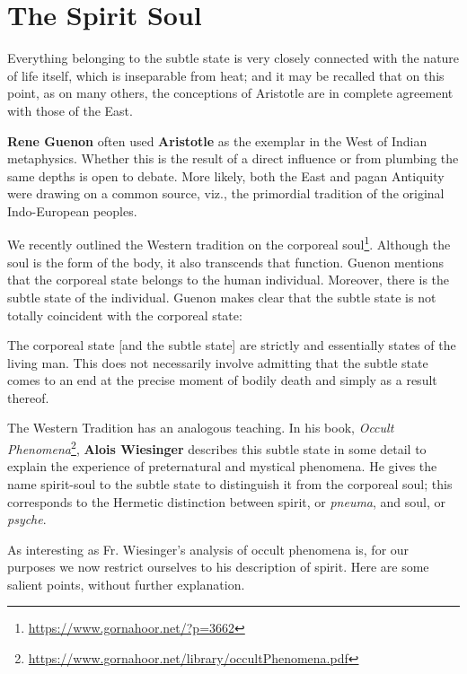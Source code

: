 \section{The Spirit Soul}

\begin{quotex}
Everything belonging to the subtle state is very closely connected with the nature of life itself, which is inseparable from heat; and it may be recalled that on this point, as on many others, the conceptions of Aristotle are in complete agreement with those of the East. 

\end{quotex}
\textbf{Rene Guenon} often used \textbf{Aristotle} as the exemplar in the West of Indian metaphysics. Whether this is the result of a direct influence or from plumbing the same depths is open to debate. More likely, both the East and pagan Antiquity were drawing on a common source, viz., the primordial tradition of the original Indo-European peoples.

We recently outlined the Western tradition on the corporeal soul\footnote{\url{https://www.gornahoor.net/?p=3662}}. Although the soul is the form of the body, it also transcends that function. Guenon mentions that the corporeal state belongs to the human individual. Moreover, there is the subtle state of the individual. Guenon makes clear that the subtle state is not totally coincident with the corporeal state:

\begin{quotex}
The corporeal state [and the subtle state] are strictly and essentially states of the living man. This does not necessarily involve admitting that the subtle state comes to an end at the precise moment of bodily death and simply as a result thereof. 

\end{quotex}
The Western Tradition has an analogous teaching. In his book, \textit{Occult Phenomena}\footnote{\url{https://www.gornahoor.net/library/occultPhenomena.pdf}}, \textbf{Alois Wiesinger} describes this subtle state in some detail to explain the experience of preternatural and mystical phenomena. He gives the name spirit-soul to the subtle state to distinguish it from the corporeal soul; this corresponds to the Hermetic distinction between spirit, or \emph{pneuma}, and soul, or \emph{psyche}.

As interesting as Fr. Wiesinger's analysis of occult phenomena is, for our purposes we now restrict ourselves to his description of spirit. Here are some salient points, without further explanation.

